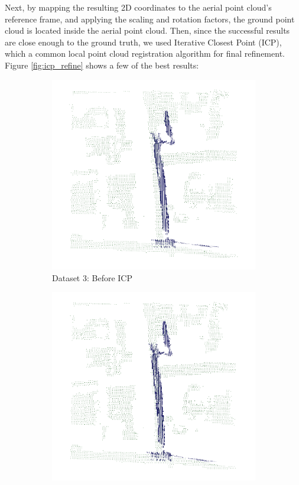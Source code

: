 \documentclass[11pt]{article}
\begin{document}
    Next, by mapping the resulting 2D coordinates to the aerial point cloud's reference frame, and applying the scaling
    and rotation factors, the ground point cloud is located inside the aerial point cloud. Then, since the successful results
    are close enough to the ground truth, we used Iterative Closest Point (ICP), which a common local point cloud
    registration algorithm for final refinement. Figure \ref{fig:icp_refine} shows a few of the best results:

    \begin{figure}[p]
        \centering
        \begin{subfigure}{0.45\textwidth}
            \centering
            \includegraphics[width=\linewidth]{images/full/ply/5_1_2_before_icp}
            \caption{Dataset 3: Before ICP}
        \end{subfigure}
        \hfill
        \begin{subfigure}{0.45\textwidth}
            \centering
            \includegraphics[width=\linewidth]{images/full/ply/5_1_2_after_icp}

\end{subfigure}
\end{figure}
\end{document}
